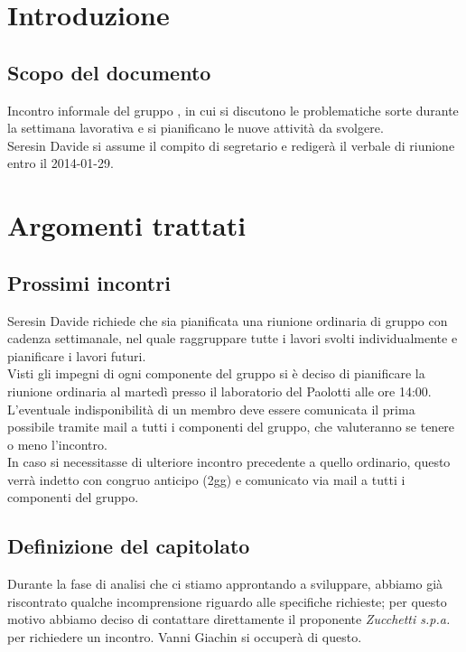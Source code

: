
\section{Introduzione}

\subsection{Scopo del documento}
Incontro informale del gruppo \gruppo{}, in cui si discutono le problematiche sorte durante la settimana lavorativa e si pianificano le nuove attività da svolgere.\\
Seresin Davide si assume il compito di segretario e redigerà il verbale di riunione entro il 2014-01-29.\\

\section{Argomenti trattati}
\subsection{Prossimi incontri}
Seresin Davide richiede che sia pianificata una riunione ordinaria di gruppo con cadenza settimanale, nel quale raggruppare tutte i lavori svolti individualmente e pianificare i lavori futuri.\\
Visti gli impegni di ogni componente del gruppo si è deciso di pianificare la riunione ordinaria al martedì presso il laboratorio del Paolotti alle ore 14:00.\\
L'eventuale indisponibilità di un membro deve essere comunicata il prima possibile tramite mail a tutti i componenti del gruppo, che valuteranno se tenere o meno l'incontro.\\
In caso si necessitasse di ulteriore incontro precedente a quello ordinario, questo verrà indetto con congruo anticipo (2gg) e comunicato via mail a tutti i componenti del gruppo.\\
\subsection{Definizione del capitolato}
Durante la fase di analisi che ci stiamo approntando a sviluppare, abbiamo già riscontrato qualche incomprensione riguardo alle specifiche richieste; per questo motivo abbiamo deciso di contattare direttamente il proponente \emph{Zucchetti s.p.a.} per richiedere un incontro. Vanni Giachin si occuperà di questo.\\
